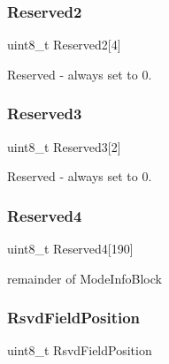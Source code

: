\subsubsection{\texorpdfstring{Reserved2}{Reserved2}}
{\footnotesize\ttfamily uint8\+\_\+t Reserved2\mbox{[}4\mbox{]}}



Reserved -\/ always set to 0. 

\hypertarget{structvbe__mode__info__t_a2455a82e0d8cc0e8d76e8cf77a68bd39}{}\label{structvbe__mode__info__t_a2455a82e0d8cc0e8d76e8cf77a68bd39} 
\subsubsection{\texorpdfstring{Reserved3}{Reserved3}}
{\footnotesize\ttfamily uint8\+\_\+t Reserved3\mbox{[}2\mbox{]}}



Reserved -\/ always set to 0. 

\hypertarget{structvbe__mode__info__t_a2e13c4795a00241b919aa3aab86560ce}{}\label{structvbe__mode__info__t_a2e13c4795a00241b919aa3aab86560ce} 
\subsubsection{\texorpdfstring{Reserved4}{Reserved4}}
{\footnotesize\ttfamily uint8\+\_\+t Reserved4\mbox{[}190\mbox{]}}



remainder of Mode\+Info\+Block 

\hypertarget{structvbe__mode__info__t_aa357b085181776f2918a6df25c88846b}{}\label{structvbe__mode__info__t_aa357b085181776f2918a6df25c88846b} 
\subsubsection{\texorpdfstring{Rsvd\+Field\+Position}{RsvdFieldPosition}}
{\footnotesize\ttfamily uint8\+\_\+t Rsvd\+Field\+Position}



